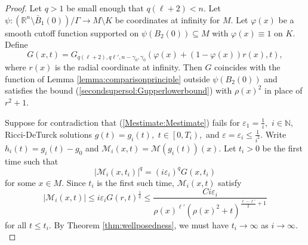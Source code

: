 \documentclass[12pt]{amsart}
\newcommand{\calM}{\mathcal{M}}
\newcommand{\LB}{\left[}
\newcommand{\N}{{\mathbb N}}
\renewcommand{\1}{{\mathbf 1}}
\newcommand{\R}{{\mathbb R}}
\newcommand{\eps}{{\varepsilon}}
\theoremstyle{others}
\numberwithin{equation}{section}
\begin{document}
\begin{proof} 

Let $q > 1$ be small enough that $q(\ell + 2) < n.$ 
Let $\psi: (\R^n \setminus \bar{B}_1(0)) / \Gamma \to M \setminus K $ be coordinates at infinity for $M$.
Let $\varphi(x)$ be a smooth cutoff function supported on  $\psi\left( B_2(0) \right) \subseteq M$ with $\varphi(x) \equiv 1$ on $K$.
Define %
\begin{equation}\label{Mestimate:Gdef}
G(x,t) = G_{q(\ell + 2), q\ell', n - \gamma_0, \gamma_0} \left(\varphi(x) + (1 - \varphi(x) ) r(x),t \right),
\end{equation}
where $r(x)$ is the radial coordinate at infinity.
Then $G$ coincides with the function of Lemma \ref{lemma:comparisonprinciple} outside $\psi( B_2(0))$ and satisfies the bound (\ref{secondsupersol:Gupperlowerbound}) with $\rho(x)^2$ in place of $r^2 + 1.$


    Suppose for contradiction that (\ref{Mestimate:Mestimate}) fails for $\eps_1 = \frac{1}{i},$ $i \in \N,$ Ricci-DeTurck solutions $g(t) = g_i(t),$ $t \in \LB 0, T_i \right),$ and $\eps = \eps_i \leq \frac{1}{i^2}.$ %
    Write $h_i(t) = g_i(t) - g_0$ and $\calM_i(x,t) = \calM(g_i(t))(x).$
    Let $t_i > 0$ be the first time such that
    \begin{equation}\label{Mestimate:Mnonestimate}
        |\calM_i(x,t_i)|^q = (i \eps_i)^q G(x,t_i)
    \end{equation}
    for some $x \in M.$ %
Since $t_i$ is the first such time, $\calM_i(x,t)$ satisfy
    \begin{equation}\label{Mestimate:MiC2bound}
        | \calM_i(x,t) | \leq i \eps_i G(r,t)^{\frac{1}{q}} \leq \frac{C i \eps_i}{\rho(x)^{\ell'} (\rho(x)^2 + t)^{\frac{\ell - \ell'}{2} + 1} }
    \end{equation}
    for all $t \leq t_i.$ By Theorem \ref{thm:wellposedness}, we must have $t_i \to \infty$ as $i \to \infty.$
    

\end{proof}
\end{document}
